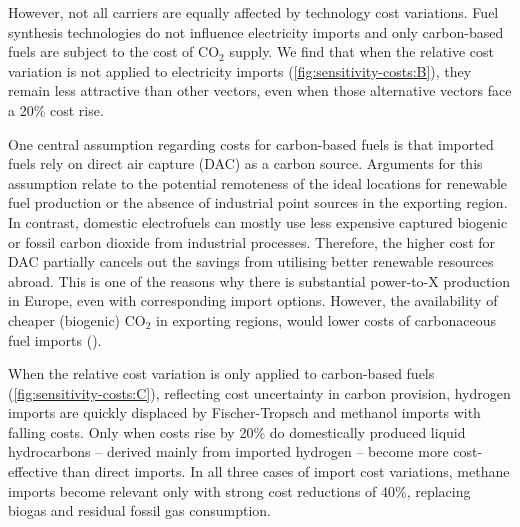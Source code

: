However, not all carriers are equally affected by technology cost variations.
Fuel synthesis technologies do not influence electricity imports and only
carbon-based fuels are subject to the cost of CO$_2$ supply. We find that when
the relative cost variation is not applied to electricity imports
(\cref{fig:sensitivity-costs:B}), they remain less attractive than other vectors, even when those alternative vectors face a 20\% cost rise.

One central assumption regarding costs for carbon-based fuels is that imported
fuels rely on direct air capture (DAC) as a carbon source. Arguments for this
assumption relate to the potential remoteness of the ideal locations for
renewable fuel production or the absence of industrial point sources in the
exporting region. In contrast, domestic electrofuels can mostly use less
expensive captured biogenic or fossil carbon dioxide from industrial processes.
Therefore, the higher cost for DAC partially cancels out the savings from
utilising better renewable resources abroad. This is one of the reasons why
there is substantial power-to-X production in Europe, even with corresponding
import options. However, the availability of cheaper (biogenic) CO$_2$ in
exporting regions, would lower costs of carbonaceous fuel imports
().

When the relative cost variation is only applied to carbon-based fuels
(\cref{fig:sensitivity-costs:C}), reflecting cost uncertainty in carbon
provision, hydrogen imports are quickly displaced by Fischer-Tropsch and
methanol imports with falling costs. Only when costs rise by 20\% do
domestically produced liquid hydrocarbons -- derived mainly from imported
hydrogen -- become more cost-effective than direct imports. In all three cases
of import cost variations, methane imports become relevant only with strong cost
reductions of 40\%, replacing biogas and residual fossil gas consumption.


